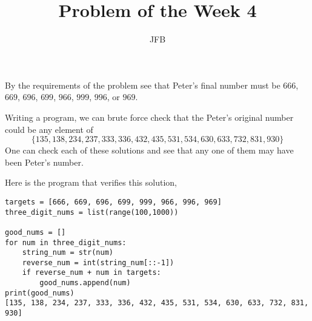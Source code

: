 \documentclass[12pt]{article}
\begin{document}
 
 
 
\title{Problem of the Week 4}%
\author{JFB} %
 
\maketitle

By the requirements of the problem see that Peter's final number must be $666$, $669$, $696$, $699$,  $966$, $999$, $996$, or $969$.

Writing a program, we can brute force check that the Peter's original number could be any element of 
$$
\{135, 138, 234, 237, 333, 336, 432, 435, 531, 534, 630, 633, 732, 831, 930 \}
$$
One can check each of these solutions and see that any one of them may have been Peter's number.

Here is the program that verifies this solution,

\begin{lstlisting}
targets = [666, 669, 696, 699, 999, 966, 996, 969] 
three_digit_nums = list(range(100,1000))

good_nums = []
for num in three_digit_nums:
    string_num = str(num)
    reverse_num = int(string_num[::-1])
    if reverse_num + num in targets:
        good_nums.append(num)
print(good_nums)
[135, 138, 234, 237, 333, 336, 432, 435, 531, 534, 630, 633, 732, 831, 930]
\end{lstlisting}
\end{document}
